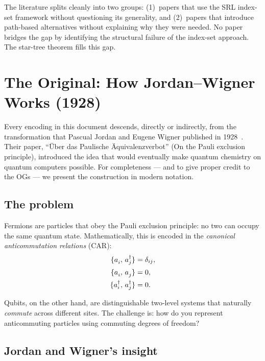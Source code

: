 \documentclass[11pt,a4paper]{article}
\newcommand{\ad}[1]{a_{#1}^{\dagger}}
\newcommand{\an}[1]{a_{#1}^{\vphantom{\dagger}}}
\newcommand{\acomm}[2]{\{#1,\,#2\}}
\theoremstyle{definition}
\begin{document}
\begin{keyinsight}
The literature splits cleanly into two groups: (1)~papers that use the
SRL index-set framework without questioning its generality, and
(2)~papers that introduce path-based alternatives without explaining
why they were needed.  No paper bridges the gap by identifying the
structural failure of the index-set approach.  The star-tree theorem
fills this gap.
\end{keyinsight}

\appendix

\section{The Original: How Jordan--Wigner Works (1928)}
\label{app:jordan-wigner}

Every encoding in this document descends, directly or indirectly, from
the transformation that Pascual Jordan and Eugene Wigner published in
1928~\cite{jordan1928}.  Their paper, ``\"{U}ber das Paulische
\"{A}quivalenzverbot'' (On the Pauli exclusion principle), introduced
the idea that would eventually make quantum chemistry on quantum
computers possible.  For completeness --- and to give proper credit
to the OGs --- we present the construction in modern notation.

\subsection*{The problem}

Fermions are particles that obey the Pauli exclusion principle: no two
can occupy the same quantum state.  Mathematically, this is encoded in
the \emph{canonical anticommutation relations} (CAR):
\begin{align}
  \acomm{\an{i}}{\ad{j}} &= \delta_{ij}, \\
  \acomm{\an{i}}{\an{j}} &= 0, \\
  \acomm{\ad{i}}{\ad{j}} &= 0.
\end{align}

Qubits, on the other hand, are distinguishable two-level systems
that naturally \emph{commute} across different sites.  The challenge
is: how do you represent anticommuting particles using commuting
degrees of freedom?

\subsection*{Jordan and Wigner's insight}
\end{document}
